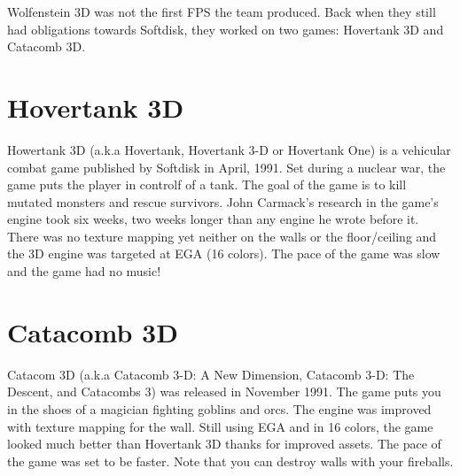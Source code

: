 Wolfenstein 3D was not the first FPS the team produced. Back when they still had obligations towards Softdisk, they worked on two games: Hovertank 3D and Catacomb 3D.\\
\par
\section{Hovertank 3D}
Howertank 3D (a.k.a Hovertank, Hovertank 3-D or Hovertank One) is a vehicular combat game published by Softdisk in April, 1991. Set during a nuclear war, the game puts the player in controlf of a tank. The goal of the game is to kill mutated monsters and rescue survivors. John Carmack's research in the game's engine took six weeks, two weeks longer than any engine he wrote before it. There was no texture mapping yet neither on the walls or the floor/ceiling and the 3D engine was targeted at EGA (16 colors). The pace of the game was slow and the game had no music! \\
\par

\section{Catacomb 3D}
Catacom 3D (a.k.a Catacomb 3-D: A New Dimension, Catacomb 3-D: The Descent, and Catacombs 3) was released in November 1991. The game puts you in the shoes of a magician fighting goblins and orcs. The engine was improved with texture mapping for the wall. Still using EGA and in 16 colors, the game looked much better than Hovertank 3D thanks for improved assets. The pace of the game was set to be faster. Note that you can destroy walls with your fireballs.\\
\par


\begin{minipage}{\textwidth}

\begin{figure}[H]
\centering
{}
\end{figure}

\begin{figure}[H]
\centering
{}
\end{figure}
\end{minipage}


\begin{minipage}{\textwidth}

\begin{figure}[H]
\centering
{}
\end{figure}

\begin{figure}[H]
\centering
{}
\end{figure}
\end{minipage}

